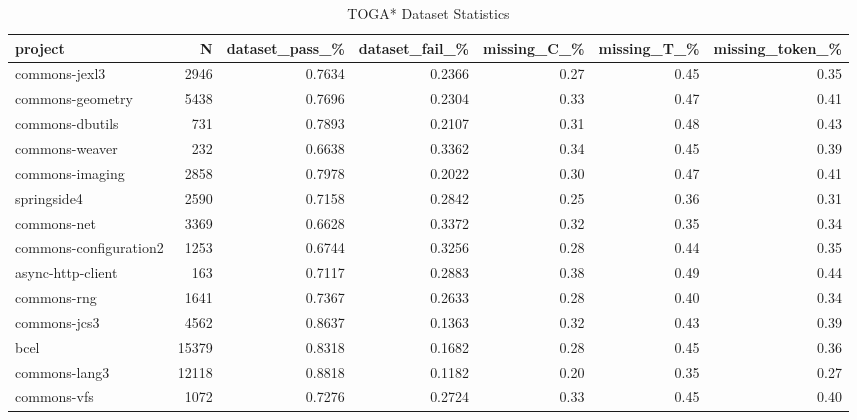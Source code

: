 \begin{table*}
\centering
\caption{TOGA* Dataset Statistics}
\label{tab:toga_stats_all}
\begin{tabular}{lrrrrrr}
\toprule
                project &       N &  dataset\_pass\_\% &  dataset\_fail\_\% &  missing\_C\_\% &  missing\_T\_\% &  missing\_token\_\% \\
\midrule
          commons-jexl3 &    2946 &          0.7634 &          0.2366 &         0.27 &         0.45 &             0.35 \\
       commons-geometry &    5438 &          0.7696 &          0.2304 &         0.33 &         0.47 &             0.41 \\
        commons-dbutils &     731 &          0.7893 &          0.2107 &         0.31 &         0.48 &             0.43 \\
         commons-weaver &     232 &          0.6638 &          0.3362 &         0.34 &         0.45 &             0.39 \\
        commons-imaging &    2858 &          0.7978 &          0.2022 &         0.30 &         0.47 &             0.41 \\
            springside4 &    2590 &          0.7158 &          0.2842 &         0.25 &         0.36 &             0.31 \\
            commons-net &    3369 &          0.6628 &          0.3372 &         0.32 &         0.35 &             0.34 \\
 commons-configuration2 &    1253 &          0.6744 &          0.3256 &         0.28 &         0.44 &             0.35 \\
      async-http-client &     163 &          0.7117 &          0.2883 &         0.38 &         0.49 &             0.44 \\
            commons-rng &    1641 &          0.7367 &          0.2633 &         0.28 &         0.40 &             0.34 \\
           commons-jcs3 &    4562 &          0.8637 &          0.1363 &         0.32 &         0.43 &             0.39 \\
                   bcel &   15379 &          0.8318 &          0.1682 &         0.28 &         0.45 &             0.36 \\
          commons-lang3 &   12118 &          0.8818 &          0.1182 &         0.20 &         0.35 &             0.27 \\
            commons-vfs &    1072 &          0.7276 &          0.2724 &         0.33 &         0.45 &             0.40 \\

\end{tabular}
\end{table*}

